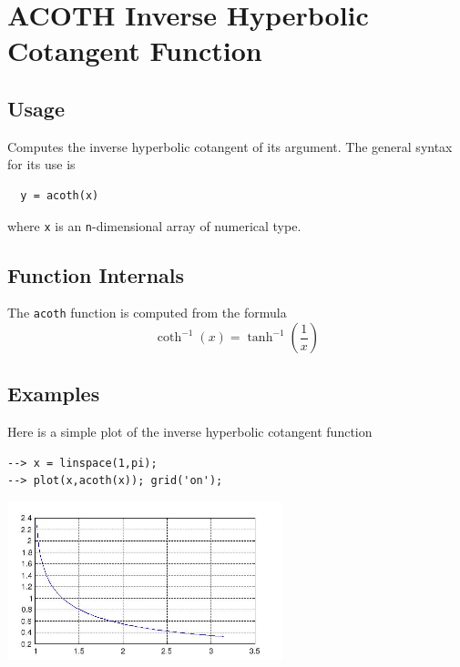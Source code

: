\section{ACOTH Inverse Hyperbolic Cotangent Function}

\subsection{Usage}

Computes the inverse hyperbolic cotangent of its argument.  The general
syntax for its use is
\begin{verbatim}
  y = acoth(x)
\end{verbatim}
where \verb|x| is an \verb|n|-dimensional array of numerical type.
\subsection{Function Internals}

The \verb|acoth| function is computed from the formula
\[
   \coth^{-1}(x) = \tanh^{-1}\left(\frac{1}{x}\right)
\]
\subsection{Examples}

Here is a simple plot of the inverse hyperbolic cotangent function
\begin{verbatim}
--> x = linspace(1,pi);
--> plot(x,acoth(x)); grid('on');
\end{verbatim}


\centerline{\includegraphics[width=8cm]{acothplot}}

